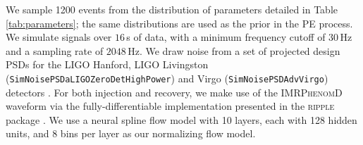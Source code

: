 \documentclass[twocolumn]{aastex631}
\begin{document}
We sample 1200 events from the distribution of parameters detailed in Table
\ref{tab:parameters}; the same distributions are used as the prior in the PE
process.  We simulate signals over $16\,$s of data, with a minimum frequency
cutoff of $30\,$Hz and a sampling rate of $2048\,$Hz. We draw noise from a set of
projected design PSDs for the LIGO Hanford, LIGO Livingston
(\texttt{SimNoisePSDaLIGOZeroDetHighPower}) and Virgo
(\texttt{SimNoisePSDAdvVirgo}) detectors
\citep{lalsuite,Shoemaker:T0900288,2012arXiv1202.4031M}. For both injection and
recovery, we make use of the \textsc{IMRPhenomD} waveform \citep{Khan:2015jqa}
via the fully-differentiable implementation presented in the \textsc{ripple}
package \citep{Edwards:2023sak}. We use a neural spline flow model \citep{2019arXiv190604032D}
with 10 layers, each with 128 hidden units, and 8 bins per layer as our
normalizing flow model.
\end{document}
